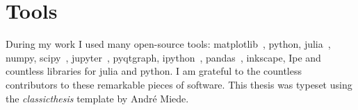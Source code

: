 \endgroup


\newpage
\section*{Tools}
During my work I used many open-source tools: matplotlib~\cite{Hunter2007}, python, julia~\cite{julia}, numpy, scipy~\cite{scipy}, jupyter~\cite{jupyter}, pyqtgraph, ipython~\cite{ipython}, pandas~\cite{pandas}, inkscape, Ipe and countless libraries for julia and python.
I am grateful to the countless contributors to these remarkable pieces of software. This thesis was typeset using the \emph{classicthesis} template by André Miede.
